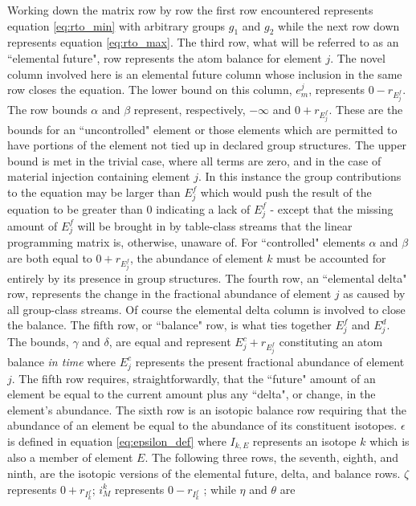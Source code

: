 \documentclass[]{elsarticle}
\begin{document}
Working down the matrix row by row the first row encountered represents equation
\ref{eq:rto_min} with arbitrary groups $g_{1}$ and $g_{2}$ while the next row 
down represents equation \ref{eq:rto_max}. The third row, what will be referred
to as an ``elemental future", row represents the atom balance for element $j$.
The novel column involved here is an elemental future column whose inclusion
in the same row closes the equation. The lower bound on this column, 
$e_{m}^{j}$, represents $0 - r_{E_{j}^{f}}$.
The row bounds $\alpha$ and $\beta$ represent, respectively,
$-\infty$ and $0 + r_{E_{j}^{f}}$. These are the bounds for an
``uncontrolled" element or those elements which are permitted to have portions
of the element not tied up in declared group structures. 
The upper bound is met in the trivial case,
where all terms are zero, and in the case of material injection containing
element $j$. In this instance the group contributions to the equation may be
larger than $E_{j}^{f}$ which would push the result of the equation to be
greater than 0 indicating a lack of $E_{j}^{f}$ - except that the missing amount
of $E_{j}^{f}$ will be brought in by table-class streams that the linear
programming matrix is, otherwise, unaware of. For ``controlled" elements
$\alpha$ and $\beta$ are both equal to $0 + r_{E_{j}^{f}}$, the abundance of 
element $k$ must be accounted for entirely by its presence in group structures.
The fourth row, an ``elemental
delta" row, represents the change in the fractional abundance of element $j$
as caused by all group-class streams. Of course the elemental delta column 
is involved to close the balance. The fifth row, or ``balance" row, is what ties
together $E_{j}^{f}$ and $E_{j}^{d}$. The bounds, $\gamma$ and $\delta$,
are equal and represent $E_{j}^{c} + r_{E_{j}^{f}}$ constituting an atom
balance \textit{in time} where $E_{j}^{c}$ represents the present fractional
abundance of element $j$. The fifth row requires, straightforwardly, that the
``future" amount of an element be equal to the current amount plus any ``delta",
or change, in the element's abundance. The sixth row is an isotopic balance row
requiring that the abundance of an element be equal to the abundance of its
constituent isotopes. $\epsilon$ is defined in equation \ref{eq:epsilon_def}
where $I_{k,E}$ represents an isotope $k$ which is also a member of 
element $E$. 
The following three rows, the seventh, eighth, and ninth,
are the isotopic versions of the elemental future, delta, and balance rows.
$\zeta$ represents
$0 + r_{I_{k}^{f}}$; $i_{M}^{k}$ represents
$0 - r_{I_{k}^{f}}$ ; while $\eta$ and $\theta$ are
\end{document}
